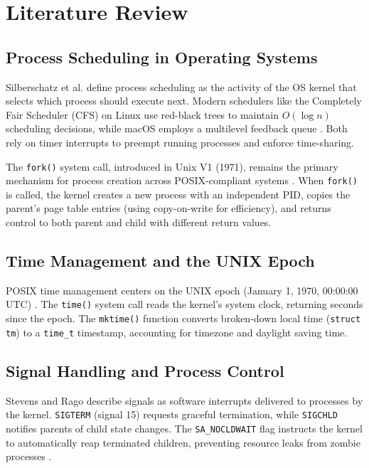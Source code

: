 \documentclass[conference]{IEEEtran}
\begin{document}
\section{Literature Review}

\subsection{Process Scheduling in Operating Systems}

Silberschatz et al. \cite{silberschatz2018} define process scheduling as the activity of the OS kernel that selects which process should execute next. Modern schedulers like the Completely Fair Scheduler (CFS) on Linux use red-black trees to maintain $O(\log n)$ scheduling decisions, while macOS employs a multilevel feedback queue \cite{love2010}. Both rely on timer interrupts to preempt running processes and enforce time-sharing.

The \texttt{fork()} system call, introduced in Unix V1 (1971), remains the primary mechanism for process creation across POSIX-compliant systems \cite{stevens2013}. When \texttt{fork()} is called, the kernel creates a new process with an independent PID, copies the parent's page table entries (using copy-on-write for efficiency), and returns control to both parent and child with different return values.

\subsection{Time Management and the UNIX Epoch}

POSIX time management centers on the UNIX epoch (January 1, 1970, 00:00:00 UTC) \cite{ieee2017}. The \texttt{time()} system call reads the kernel's system clock, returning seconds since the epoch. The \texttt{mktime()} function converts broken-down local time (\texttt{struct tm}) to a \texttt{time\_t} timestamp, accounting for timezone and daylight saving time.

\subsection{Signal Handling and Process Control}

Stevens and Rago \cite{stevens2013} describe signals as software interrupts delivered to processes by the kernel. \texttt{SIGTERM} (signal 15) requests graceful termination, while \texttt{SIGCHLD} notifies parents of child state changes. The \texttt{SA\_NOCLDWAIT} flag instructs the kernel to automatically reap terminated children, preventing resource leaks from zombie processes \cite{kerrisk2010}.
\end{document}
